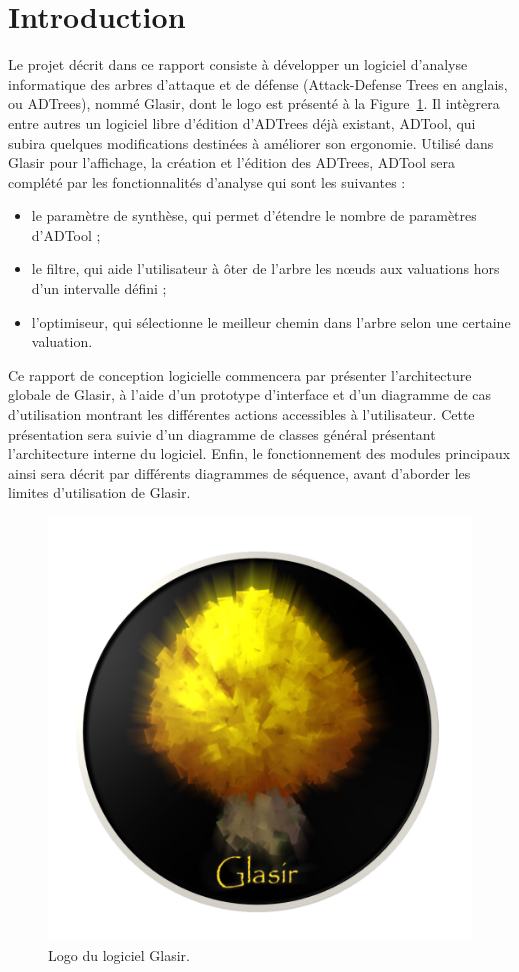 \section{Introduction}
    \label{sec:intro}

    Le projet décrit dans ce rapport consiste à développer un logiciel d'analyse informatique des arbres d'attaque et de défense (\og Attack-Defense Trees \fg{} en anglais, ou ADTrees), nommé Glasir, dont le logo est présenté à la {\sc Figure}~\ref{fig:glasir}. Il intègrera entre autres un logiciel libre d'édition d'ADTrees déjà existant, ADTool, qui subira quelques modifications destinées à améliorer son ergonomie. Utilisé dans Glasir pour l'affichage, la création et l'édition des ADTrees, ADTool sera complété par les fonctionnalités d'analyse qui sont les suivantes :

    \begin{itemize}
    	\item le paramètre de synthèse, qui permet d'étendre le nombre de paramètres d'ADTool ;
    	\item le filtre, qui aide l'utilisateur à ôter de l’arbre les nœuds aux valuations hors d'un intervalle défini ;
    	\item l'optimiseur, qui sélectionne le meilleur chemin dans l'arbre selon une certaine valuation.
    \end{itemize} 

    Ce rapport de conception logicielle commencera par présenter l'architecture globale de Glasir, à l'aide d'un prototype d'interface et d'un diagramme de cas d'utilisation montrant les différentes actions accessibles à l'utilisateur. Cette présentation sera suivie d'un diagramme de classes général présentant l'architecture interne du logiciel. Enfin, le fonctionnement des modules principaux ainsi sera décrit par différents diagrammes de séquence, avant d'aborder les limites d'utilisation de Glasir.

    \begin{figure}[H]
        \centering
        \includegraphics[height=0.5\textwidth]{figure/glasir.png}
        \caption{Logo du logiciel Glasir.}
        \label{fig:glasir}
    \end{figure}